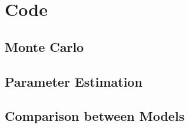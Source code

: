 \documentclass[paper.tex]{subfiles}
\begin{document}
        \newpage
    \section{Code}
        \subsection{Monte Carlo}
        
        \subsection{Parameter Estimation}
        
        \subsection{Comparison between Models}
        
\end{document}
